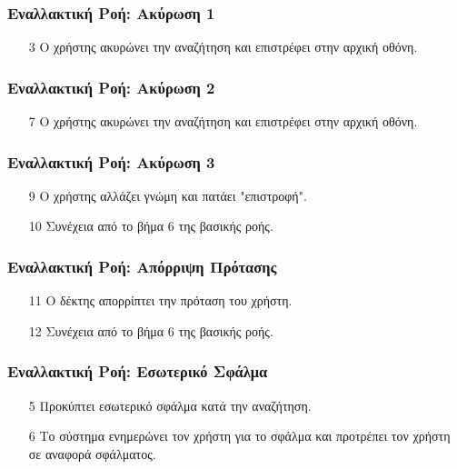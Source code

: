 \subsubsection{Εναλλακτική Ροή: Ακύρωση 1}

\begin{enumerate}
    \item[3] Ο χρήστης ακυρώνει την αναζήτηση και επιστρέφει στην αρχική οθόνη.
\end{enumerate}

\subsubsection{Εναλλακτική Ροή: Ακύρωση 2}

\begin{enumerate}
    \item[7] Ο χρήστης ακυρώνει την αναζήτηση και επιστρέφει στην αρχική οθόνη.
\end{enumerate}

\subsubsection{Εναλλακτική Ροή: Ακύρωση 3}

\begin{enumerate}
    \item[9] Ο χρήστης αλλάζει γνώμη και πατάει "επιστροφή".
    \item[10] Συνέχεια από το βήμα 6 της βασικής ροής.
\end{enumerate}

\subsubsection{Εναλλακτική Ροή: Απόρριψη Πρότασης}

\begin{enumerate}
    \item[11] Ο δέκτης απορρίπτει την πρόταση του χρήστη.
    \item[12] Συνέχεια από το βήμα 6 της βασικής ροής.
\end{enumerate}

\subsubsection{Εναλλακτική Ροή: Εσωτερικό Σφάλμα}

\begin{enumerate}
    \item[5] Προκύπτει εσωτερικό σφάλμα κατά την αναζήτηση.
    \item[6] Το σύστημα ενημερώνει τον χρήστη για το σφάλμα και προτρέπει τον
        χρήστη σε αναφορά σφάλματος.
\end{enumerate}

